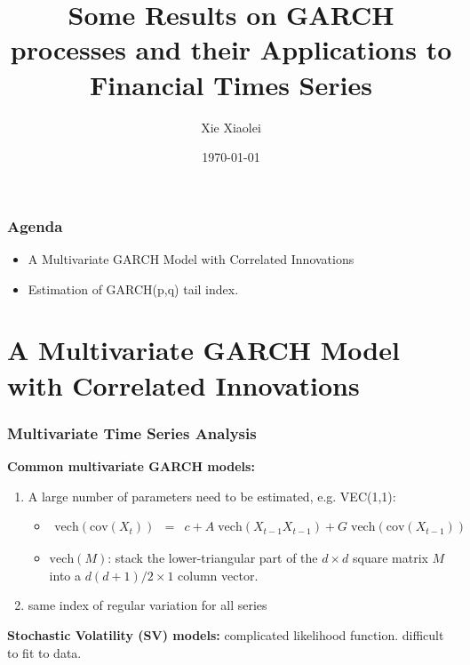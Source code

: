 \documentclass{beamer}
\title{Some Results on GARCH processes and their Applications to Financial Times Series}
\author{Xie Xiaolei} %
\institute[UCPH] %
{
University of Copenhagen \\ %
\medskip
\textit{xie@math.ku.dk} %
}
\date{\today} %
\begin{document}
\begin{frame}
\titlepage %
\end{frame}


\begin{frame}
  \frametitle{Agenda}
  \begin{itemize}
  \item A Multivariate GARCH Model with Correlated Innovations
  \item Estimation of GARCH(p,q) tail index.
  \end{itemize}
\end{frame}

\section{A Multivariate GARCH Model with Correlated Innovations}
\begin{frame}
  \frametitle{Multivariate Time Series Analysis}
  {\bf Common multivariate GARCH models:}
  \begin{enumerate}
  \item A large number of parameters need to be estimated,
    e.g. VEC(1,1):
    \begin{itemize}
    \item
      \begin{eqnarray*}
        \text{vech}(\text{cov}(X_t)) &=& c + A\;\text{vech}(X_{t-1}
        X_{t-1}) + G\;\text{vech}(\text{cov}(X_{t-1}))
      \end{eqnarray*}
    \item 
      $\text{vech}(M)$: stack the lower-triangular part of the
      $d \times d$ square matrix $M$ into a $d(d+1)/2 \times 1$ column vector.
    \end{itemize}
  \item same index of regular variation for all series 
  \end{enumerate}
  {\bf Stochastic Volatility (SV) models:} complicated likelihood
  function. difficult to fit to data.
\end{frame}
\end{document}
